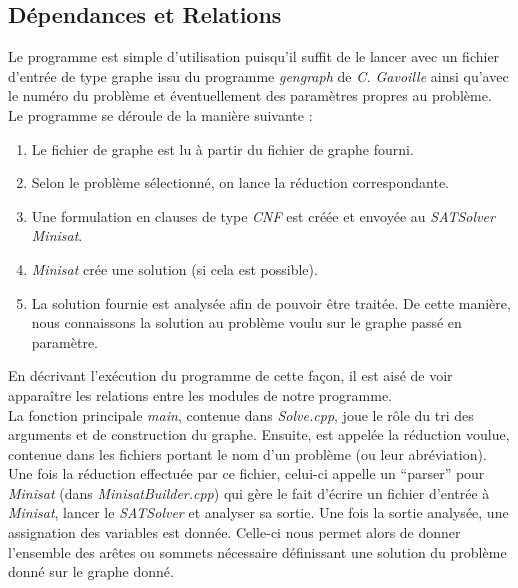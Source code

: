   \subsection{Dépendances et Relations}
  Le programme est simple d'utilisation puisqu'il suffit de le lancer
  avec un fichier d'entrée de type graphe issu du programme
  \emph{gengraph} de \emph{C. Gavoille} ainsi qu'avec le numéro du
  problème et éventuellement des paramètres propres au problème.\\
  Le programme se déroule de la manière suivante :
  \begin{enumerate}
   \item Le fichier de graphe est lu à partir du fichier de graphe
	 fourni. 
   \item Selon le problème sélectionné, on lance la réduction
	 correspondante. 
   \item Une formulation en clauses de type \emph{CNF} est créée et
	 envoyée au \emph{SATSolver} \emph{Minisat}. 
   \item \emph{Minisat} crée une solution (si cela est possible).
   \item La solution fournie est analysée afin de pouvoir être
	 traitée. De cette manière, nous connaissons la solution au
	 problème voulu sur le graphe passé en paramètre. 
  \end{enumerate}
  
  En décrivant l'exécution du programme de cette façon, il est aisé de
  voir apparaître les relations entre les modules de notre programme.\\
  La fonction principale \emph{main}, contenue dans \emph{Solve.cpp},
  joue le rôle du tri des arguments et de construction du
  graphe. Ensuite, est appelée la réduction voulue, contenue dans les
  fichiers portant le nom d'un problème (ou leur abréviation). Une fois
  la réduction effectuée par ce fichier, celui-ci appelle un ``parser''
  pour \emph{Minisat} (dans \emph{MinisatBuilder.cpp}) qui gère le fait
  d'écrire un fichier d'entrée à \emph{Minisat}, lancer le
  \emph{SATSolver} et analyser sa sortie. Une fois la sortie analysée,
  une assignation des variables est donnée. Celle-ci nous permet alors
  de donner l'ensemble des arêtes ou sommets nécessaire définissant une
  solution du problème donné sur le graphe donné.\\

